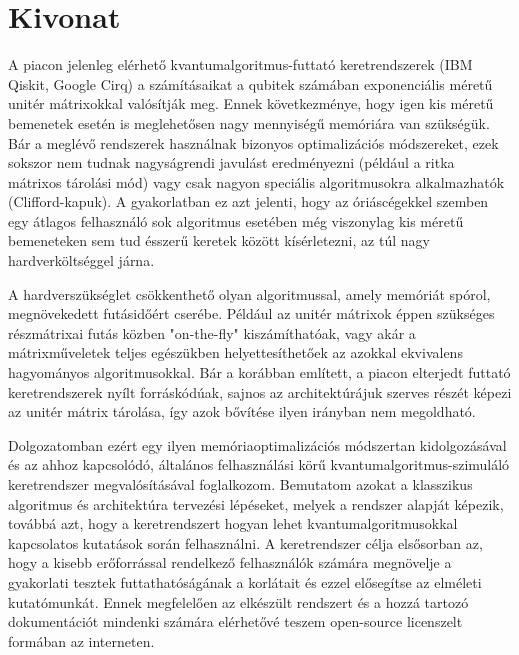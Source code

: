 \setcounter{page}{1}

\selecthungarian

\chapter*{Kivonat}

A piacon jelenleg elérhető kvantumalgoritmus-futtató keretrendszerek (IBM Qiskit, Google Cirq) a számításaikat a qubitek számában exponenciális méretű unitér mátrixokkal valósítják meg. Ennek következménye, hogy igen kis méretű bemenetek esetén is meglehetősen nagy mennyiségű memóriára van szükségük. Bár a meglévő rendszerek használnak bizonyos optimalizációs módszereket, ezek sokszor nem tudnak nagyságrendi javulást eredményezni (például a ritka mátrixos tárolási mód) vagy csak nagyon speciális algoritmusokra alkalmazhatók (Clifford-kapuk). A gyakorlatban ez azt jelenti, hogy az óriáscégekkel szemben egy átlagos felhasználó sok algoritmus esetében még viszonylag kis méretű bemeneteken sem tud ésszerű keretek között kísérletezni, az túl nagy hardverköltséggel járna.

A hardverszükséglet csökkenthető olyan algoritmussal, amely memóriát spórol, megnövekedett futásidőért cserébe. Például az unitér mátrixok éppen szükséges részmátrixai futás közben "on-the-fly" kiszámíthatóak, vagy akár a mátrixműveletek teljes egészükben helyettesíthetőek az azokkal ekvivalens hagyományos algoritmusokkal. Bár a korábban említett, a piacon elterjedt futtató keretrendszerek nyílt forráskódúak, sajnos az architektúrájuk szerves részét képezi az unitér mátrix tárolása, így azok bővítése ilyen irányban nem megoldható.

Dolgozatomban ezért egy ilyen memóriaoptimalizációs módszertan kidolgozásával és az ahhoz kapcsolódó, általános felhasználási körű kvantumalgoritmus-szimuláló keretrendszer megvalósításával foglalkozom. Bemutatom azokat a klasszikus algoritmus és architektúra tervezési lépéseket, melyek a rendszer alapját képezik, továbbá azt, hogy a keretrendszert hogyan lehet kvantumalgoritmusokkal kapcsolatos kutatások során felhasználni. A keretrendszer célja elsősorban az, hogy a kisebb erőforrással rendelkező felhasználók számára megnövelje a gyakorlati tesztek futtathatóságának a korlátait és ezzel elősegítse az elméleti kutatómunkát. Ennek megfelelően az elkészült rendszert és a hozzá tartozó dokumentációt mindenki számára elérhetővé teszem open-source licenszelt formában az interneten.

